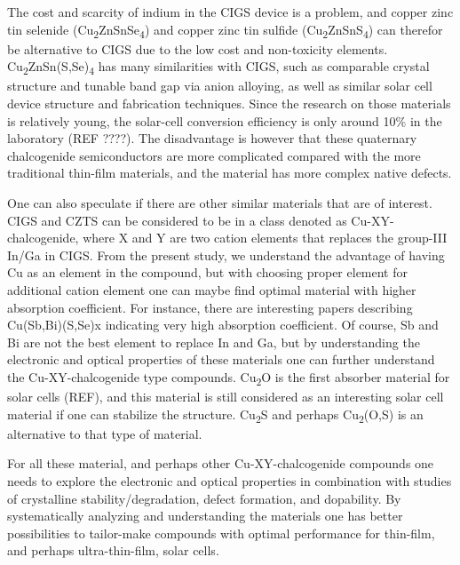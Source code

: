 \documentclass[a4paper, 12pt, titlepage,oneside,drop]{kthesis}
\begin{document}
The cost and scarcity of indium in the CIGS device is a problem, and  copper zinc tin selenide 
(Cu\textsubscript{2}ZnSnSe\textsubscript{4}) and
copper zinc tin sulfide (Cu\textsubscript{2}ZnSnS\textsubscript{4}) 
can therefor be alternative to CIGS due to the low cost and non-toxicity elements. 
Cu\textsubscript{2}ZnSn(S,Se)\textsubscript{4} has many similarities with CIGS, such as comparable crystal structure and 
tunable band gap via anion alloying, as well as similar solar cell device structure and fabrication techniques. 
Since the research on those materials is relatively young, the solar-cell conversion efficiency
is only around 10\% in the laboratory (REF ????). The disadvantage is however that  these quaternary 
chalcogenide semiconductors are more complicated compared with the more traditional thin-film materials, 
and the material has more complex native defects. 

One can also speculate if there are other similar materials that are of interest. CIGS and CZTS can be 
considered to be in a class denoted as Cu-XY-chalcogenide, where X and Y are two cation elements that replaces the 
group-III In/Ga in CIGS. From the present study, we understand the advantage of having Cu as an element in the 
compound, but with choosing proper element for additional cation element one can maybe find optimal material 
with higher absorption coefficient.  
For instance, there are interesting papers describing Cu(Sb,Bi)(S,Se)x indicating very high absorption coefficient. 
Of course, Sb and Bi are not the best element to replace In and Ga, but by understanding the electronic and optical 
properties of these materials one can further understand the Cu-XY-chalcogenide type compounds.    
Cu\textsubscript{2}O is the first absorber material for solar cells (REF), and this material is still considered as an interesting solar cell material if one can stabilize the structure.
Cu\textsubscript{2}S and perhaps Cu\textsubscript{2}(O,S) is an alternative to that type of material.

For all these material, and perhaps other Cu-XY-chalcogenide compounds one needs to explore the electronic and optical properties in combination with studies of crystalline stability/degradation, defect formation, and dopability. 
By systematically analyzing and understanding the materials one has better possibilities to tailor-make compounds with optimal performance for thin-film, and perhaps ultra-thin-film, solar cells.


 
\end{document}
